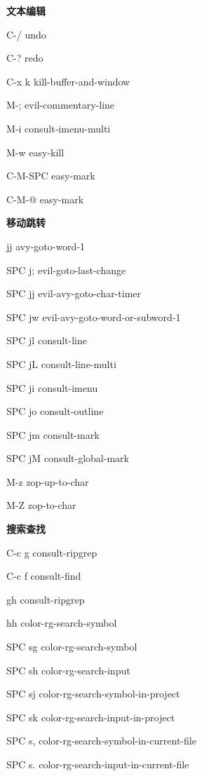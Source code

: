 \documentclass[10pt]{article}
\renewcommand\subsection[1]{\smallskip\par\textbf{\color{heading}#1}}
\begin{document}
\begin{multicols}{3}
  \subsection{文本编辑}
  \begin{keylist}
  \item[C-/] undo
  \item[C-?] redo
  \item[C-x k] kill-buffer-and-window
  \item[M-;] evil-commentary-line
  \item[M-i] consult-imenu-multi
  \item[M-w] easy-kill
  \item[C-M-SPC] easy-mark
  \item[C-M-@] easy-mark
  \end{keylist}

  \subsection{移动跳转}
  \begin{keylist}
  \item[jj] avy-goto-word-1
  \item[SPC j;] evil-goto-last-change
  \item[SPC jj] evil-avy-goto-char-timer
  \item[SPC jw] evil-avy-goto-word-or-subword-1
  \item[SPC jl] consult-line
  \item[SPC jL] consult-line-multi
  \item[SPC ji] consult-imenu
  \item[SPC jo] consult-outline
  \item[SPC jm] consult-mark
  \item[SPC jM] consult-global-mark
  \item[M-z] zop-up-to-char
  \item[M-Z] zop-to-char
  \end{keylist}

  \subsection{搜索查找}
  \begin{keylist}
  \item[C-c g] consult-ripgrep
  \item[C-c f] consult-find
  \item[gh] consult-ripgrep
  \item[hh] color-rg-search-symbol
  \item[SPC sg] color-rg-search-symbol
  \item[SPC sh] color-rg-search-input
  \item[SPC sj] color-rg-search-symbol-in-project
  \item[SPC sk] color-rg-search-input-in-project
  \item[SPC s,] color-rg-search-symbol-in-current-file
  \item[SPC s.] color-rg-search-input-in-current-file
  \end{keylist}


\end{multicols}
\end{document}
